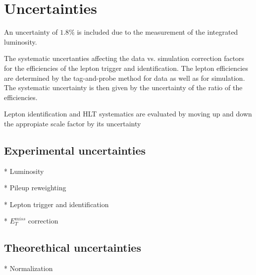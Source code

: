 \section{Uncertainties}

An uncertainty of $1.8\%$ is included due to the measurement of
the integrated luminosity.

The systematic uncertanties affecting the data vs. simulation correction factors
for the efficiencies of the lepton trigger and identification. The lepton
efficiencies are determined by the tag-and-probe method for data as well as for
simulation. The systematic uncertainty is then given by the uncertainty of
the ratio of the efficiencies.

Lepton identification and HLT systematics are evaluated by moving up and down
the appropiate scale factor by its uncertainty

\subsection{Experimental uncertainties}

* Luminosity

* Pileup reweighting

* Lepton trigger and identification

* $E_{T}^{miss}$ correction

\subsection{Theorethical uncertainties}

* Normalization







